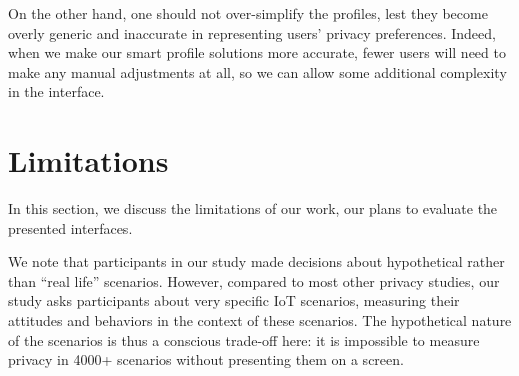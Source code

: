 On the other hand, one should not over-simplify the profiles, lest they become overly generic and inaccurate in representing users' privacy preferences. Indeed, when we make our smart profile solutions more accurate, fewer users will need to make any manual adjustments at all, so we can allow some additional complexity in the interface.

\section{Limitations}\label{sec:future_work}

In this section, we discuss the limitations of our work, our plans to evaluate the presented interfaces.


We note that participants in our study made decisions about hypothetical rather than ``real life'' scenarios. However, compared to most other privacy studies, our study asks participants about very specific IoT scenarios, measuring their attitudes and behaviors in the context of these scenarios. The hypothetical nature of the scenarios is thus a conscious trade-off here: it is impossible to measure privacy in 4000+ scenarios without presenting them on a screen.


